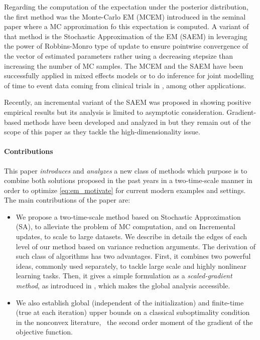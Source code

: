 \documentclass[11pt]{article}
\theoremstyle{t}
\begin{document}
Regarding the computation of the expectation under the posterior distribution, the first method was the Monte-Carlo EM (MCEM) introduced in the seminal paper \citep{wei1990monte} where a MC approximation fo this expectation is computed. A variant of that method is the Stochastic Approximation of the EM (SAEM) in \citep{delyon1999} leveraging the power of Robbins-Monro type of update \citep{robbins1951stochastic} to ensure pointwise convergence of the vector of estimated parameters rather using a decreasing stepsize than increasing the number of MC samples.
The MCEM and the SAEM have been successfully applied in mixed effects models \citep{mcculloch1997maximum,hughes1999mixed,baey2016nonlinear} or to do inference for joint modelling of time to event data coming from clinical trials in \citep{das2010Inferences}, among other applications.

Recently, an incremental variant of the SAEM was proposed in \citep{kuhn2019properties} showing positive empirical results but its analysis is limited to asymptotic consideration. 
Gradient-based methods have been developed and analyzed in \citep{zhu2017high} but they remain out of the scope of this paper as they tackle the high-dimensionality issue.


\paragraph{Contributions} This paper \textit{introduces} and \textit{analyzes} a new class of methods which purpose is to combine both solutions proposed in the past years in a two-time-scale manner in order to optimize \eqref{eq:em_motivate} for current modern examples and settings. The main contributions of the paper are:
\begin{itemize}

\item We propose a two-time-scale method based on Stochastic Approximation (SA), to alleviate the problem of MC computation, and on Incremental updates, to scale to large datasets. We describe in details the edges of each level of our method based on variance reduction arguments. The derivation of such class of algorithms has two advantages. First, it combines two powerful ideas, commonly used separately, to tackle large scale and highly nonlinear learning tasks. Then, it gives a simple formulation as a \textit{scaled-gradient method}, as introduced in \citep{karimi2019global}, which makes the global analysis accessible.

\item We also establish global (independent of the initialization) and finite-time (true at each iteration) upper bounds on a classical suboptimality condition in the nonconvex literature, \ie\ the second order moment of the gradient of the objective function. 


\end{itemize}
\end{document}
